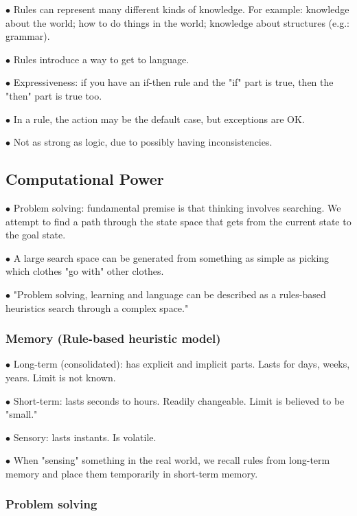 \documentclass[english,openany]{book}
\begin{document}
$\bullet$ Rules can represent many different kinds of knowledge. For example: knowledge about the world; how to do things in the world; knowledge about structures (e.g.: grammar).

$\bullet$ Rules introduce a way to get to language.

$\bullet$ Expressiveness: if you have an if-then rule and the "if" part is true, then the "then" part is true too.

$\bullet$ In a rule, the action may be the default case, but exceptions are OK.

$\bullet$ Not as strong as logic, due to possibly having inconsistencies.

\subsection{Computational Power}

$\bullet$ Problem solving: fundamental premise is that thinking involves searching. We attempt to find a path through the state space that gets from the current state to the goal state.

$\bullet$ A large search space can be generated from something as simple as picking which clothes "go with" other clothes.

$\bullet$ "Problem solving, learning and language can be described as a rules-based heuristics search through a complex space."

\subsubsection{Memory (Rule-based heuristic model)}

$\bullet$ Long-term (consolidated): has explicit and implicit parts. Lasts for days, weeks, years. Limit is not known.

$\bullet$ Short-term: lasts seconds to hours. Readily changeable. Limit is believed to be "small."

$\bullet$ Sensory: lasts instants. Is volatile.

$\bullet$ When "sensing" something in the real world, we recall rules from long-term memory and place them temporarily in short-term memory.


\subsubsection{Problem solving}
\end{document}
